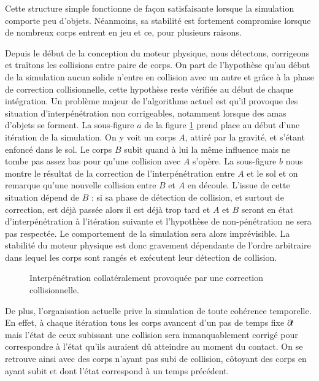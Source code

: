 Cette structure simple fonctionne de façon satisfaisante lorsque la
simulation comporte peu d'objets. Néanmoins, sa stabilité est
fortement compromise lorsque de nombreux corps entrent en jeu et ce,
pour plusieurs raisons.

Depuis le début de la conception du moteur physique, nous détectons,
corrigeons et traîtons les collisions entre paire de corps. On part de
l'hypothèse qu'au début de la simulation aucun solide n'entre en
collision avec un autre et grâce à la phase de correction
collisionnelle, cette hypothèse reste vérifiée au début de chaque
intégration. Un problème majeur de l'algorithme actuel est qu'il
provoque des situation d'interpénétration non corrigeables, notamment
lorsque des amas d'objets se forment. La sous-figure $a$ de la figure
\ref{probleme} prend place au début d'une itération de la simulation.
On y voit un corps $A$, attiré par la gravité, et s'étant enfoncé dans
le sol. Le corps $B$ subit quand à lui la même influence mais ne tombe
pas assez bas pour qu'une collision avec $A$ s'opère. La sous-figure
$b$ nous montre le résultat de la correction de l'interpénétration
entre $A$ et le sol et on remarque qu'une nouvelle collision entre $B$
et $A$ en découle. L'issue de cette situation dépend de $B$ : si sa
phase de détection de collision, et surtout de correction, est déjà
passée alors il est déjà trop tard et $A$ et $B$ seront en état
d'interpénétration à l'itération suivante et l'hypothèse de
non-pénétration ne sera pas respectée. Le comportement de la
simulation sera alors imprévisible. La stabilité du moteur physique
est donc gravement dépendante de l'ordre arbitraire dans lequel les
corps sont rangés et exécutent leur détection de collision.

\begin{figure}
  \centering
  \subfloat[]{  }
  \subfloat[]{  }
  \caption{Interpénétration collatéralement provoquée par une correction collisionnelle.}
  \label{probleme}
\end{figure}

De plus, l'organisation actuelle prive la simulation de toute
cohérence temporelle. En effet, à chaque itération tous les corps
avancent d'un pas de temps fixe $\partial \! t$ mais l'état de ceux
subissant une collision sera inmanquablement corrigé pour correspondre
à l'état qu'ils auraient dû atteindre au moment du contact. On se
retrouve ainsi avec des corps n'ayant pas subi de collision, côtoyant
des corps en ayant subit et dont l'état correspond à un temps
précédent.

